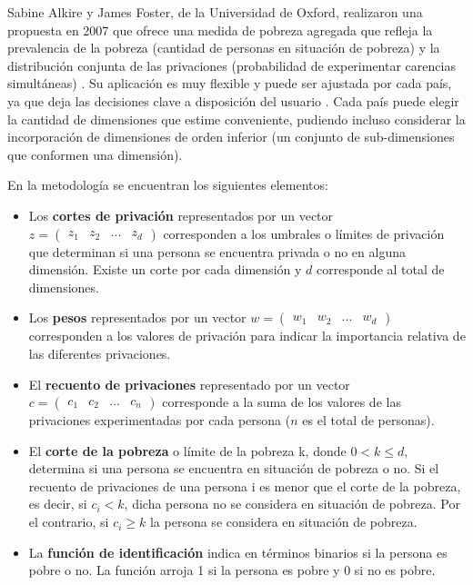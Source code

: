 \documentclass[12pt,letterpaper,spanish]{article}
\begin{document}
Sabine Alkire y James Foster, de la Universidad de Oxford, realizaron una propuesta en 2007 que ofrece una medida de pobreza agregada que refleja la prevalencia de la pobreza (cantidad de personas en situación de pobreza) y la distribución conjunta de las privaciones (probabilidad de experimentar carencias simultáneas) \cite{Alkire2007CountingMeasurement}. Su aplicación es muy flexible y puede ser ajustada por cada país, ya que deja las decisiones clave a disposición del usuario \cite{Alkire2011UnderstandingsMeasurement}. Cada país puede elegir la cantidad de dimensiones que estime conveniente, pudiendo incluso considerar la incorporación de dimensiones de orden inferior (un conjunto de sub-dimensiones que conformen una dimensión).

En la metodología se encuentran los siguientes elementos:
\begin{itemize}

\item Los \textbf{cortes de privación} representados por un vector $z= \begin{pmatrix} z_{1} & z_{2} & ... & z_{d} \end{pmatrix}$ corresponden a los umbrales o límites de privación que determinan si una persona se encuentra privada o no en alguna dimensión. Existe un corte por cada dimensión y $d$ corresponde al total de dimensiones. 
\item Los \textbf{pesos} representados por un vector  $w= \begin{pmatrix} w_{1} & w_{2} & ... & w_{d} \end{pmatrix}$ corresponden a los valores de privación para indicar la importancia relativa de las diferentes privaciones.
\item El \textbf{recuento de privaciones} representado por un vector $c= \begin{pmatrix} c_{1} & c_{2} & ... & c_{n} \end{pmatrix}$ corresponde a la suma de los valores de las privaciones experimentadas por cada persona ($n$ es el total de personas). 
\item El \textbf{corte de la pobreza} o límite de la pobreza k, donde $0< k\leq d$, determina si una persona se encuentra en situación de pobreza o no. Si el recuento de privaciones de una persona i es menor que el corte de la pobreza, es decir, si $c_{i}< k$, dicha persona no se considera en situación de pobreza. Por el contrario, si $c_{i}\geq k$ la persona se considera en situación de pobreza.
\item La \textbf{función de identificación} indica en términos binarios si la persona es pobre o no. La función arroja 1 si la persona es pobre y 0 si no es pobre.
\end{itemize}
\end{document}
